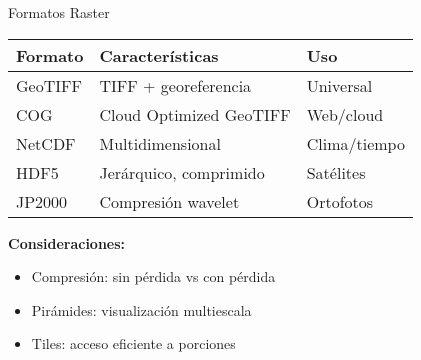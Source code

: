 \documentclass[10pt]{beamer}
\begin{document}
\begin{frame}{Formatos Raster}
    \begin{table}
        \small
        \begin{tabular}{lll}
        \toprule
        \textbf{Formato} & \textbf{Características} & \textbf{Uso} \\
        \midrule
        GeoTIFF & TIFF + georeferencia & Universal \\
        COG & Cloud Optimized GeoTIFF & Web/cloud \\
        NetCDF & Multidimensional & Clima/tiempo \\
        HDF5 & Jerárquico, comprimido & Satélites \\
        JP2000 & Compresión wavelet & Ortofotos \\
        \bottomrule
        \end{tabular}
    \end{table}
    
    \vspace{0.5cm}
    
    \begin{tcolorbox}[colframe=usachblue,colback=blue!5]
        \textbf{Consideraciones:}
        \begin{itemize}
            \item Compresión: sin pérdida vs con pérdida
            \item Pirámides: visualización multiescala
            \item Tiles: acceso eficiente a porciones
        \end{itemize}
    \end{tcolorbox}
\end{frame}
\end{document}
